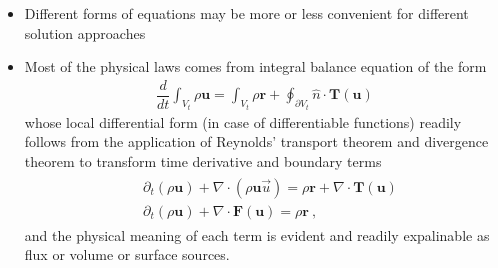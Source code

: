 \documentclass[letterpaper,10pt,english]{jupyterBook}
\begin{document}
\sphinxAtStartPar
{}
\begin{itemize}
\item {} 
\sphinxAtStartPar
Different forms of equations may be more or less convenient for different solution approaches

\item {} 
\sphinxAtStartPar
Most of the physical laws comes from integral balance equation of the form
\begin{equation*}
\begin{split}\dfrac{d}{dt} \int_{V_t} \rho \mathbf{u} = \int_{V_t} \rho \mathbf{r} + \oint_{\partial V_t} \hat{n} \cdot \mathbf{T}(\mathbf{u})\end{split}
\end{equation*}
\sphinxAtStartPar
whose local \sphinxhyphen{} differential \sphinxhyphen{} form (in case of differentiable functions) readily follows from the application of Reynolds’ transport theorem and divergence theorem to transform time derivative and boundary terms
\begin{equation*}
\begin{split}\begin{aligned}
     & \partial_t \left( \rho \mathbf{u} \right) + \nabla \cdot (\rho \mathbf{u} \vec{u}) = \rho \mathbf{r} + \nabla \cdot \mathbf{T}(\mathbf{u}) \\
     & \partial_t \left( \rho \mathbf{u} \right) + \nabla \cdot \mathbf{F}(\mathbf{u}) = \rho \mathbf{r} \ ,
   \end{aligned}\end{split}
\end{equation*}
\sphinxAtStartPar
and the physical meaning of each term is evident and readily expalinable as flux or volume or surface sources.


\end{itemize}
\end{document}
